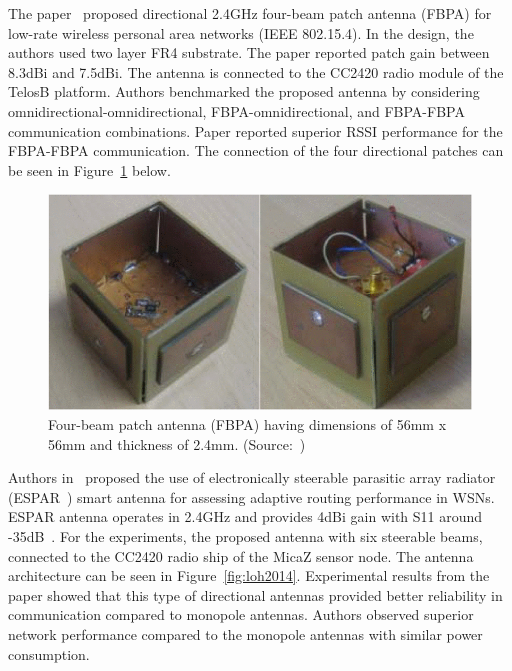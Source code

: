 \documentclass[12pt, oneandhalf, chaparabic, sees, ms]{metu}
\begin{document}
\newpage








The paper~\cite{giorgetti2007} proposed directional 2.4GHz four-beam patch antenna (FBPA) for low-rate wireless personal area networks (IEEE 802.15.4).
In the design, the authors used two layer FR4 substrate.  The paper reported patch gain between 8.3dBi and 7.5dBi.
The antenna is connected to the CC2420 radio module of the TelosB platform. Authors benchmarked the proposed antenna by considering 
omnidirectional-omnidirectional, FBPA-omnidirectional, and FBPA-FBPA communication combinations. Paper reported superior RSSI performance for the 
FBPA-FBPA communication. The connection of the four directional patches can be seen in Figure~\ref{fig:giorgetti} below.
\vspace{2cm}
% 
%
%
\begin{figure}[!htbp]
 \begin{center}
  \includegraphics[width=\textwidth]{giorgetti.png}
 \end{center}
 \caption{Four-beam patch antenna (FBPA) having dimensions of 56mm x 56mm and thickness of 2.4mm. (Source:~\protect\cite{giorgetti2007}) }
  \label{fig:giorgetti}
\end{figure}
% 
%
%

\newpage

Authors in~\cite{loh2014} proposed the use of electronically steerable parasitic array radiator (ESPAR~\cite{liu2012}) smart antenna
for assessing adaptive routing performance in WSNs. ESPAR antenna operates in 2.4GHz and provides 4dBi gain with S11 around -35dB~\cite{liu2012}.
For the experiments, the proposed antenna with six steerable beams, connected to the CC2420 radio ship of the MicaZ sensor node. The antenna architecture can be seen in Figure~\ref{fig:loh2014}.
Experimental results from the paper showed that this type of directional antennas provided better reliability in communication compared to monopole antennas.
Authors observed superior network performance compared to the monopole antennas with similar power consumption. 
\end{document}
